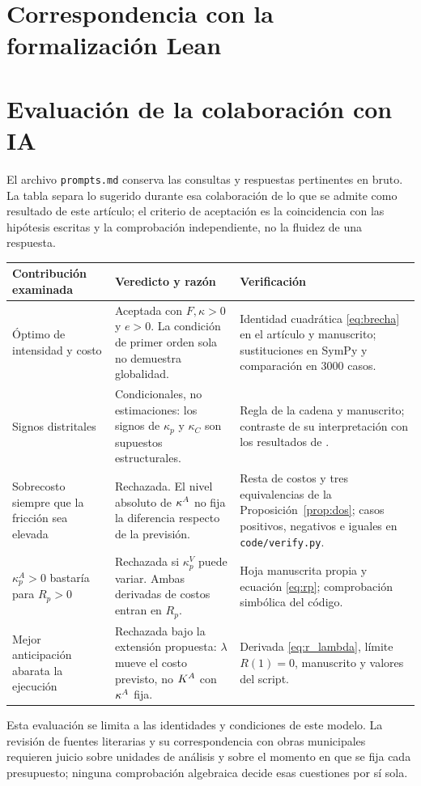 \clearpage
\section{Correspondencia con la formalización Lean}\label{app:lean}


\clearpage
\section{Evaluación de la colaboración con IA}\label{app:ia}
El archivo \texttt{prompts.md} conserva las consultas y respuestas pertinentes en bruto. La tabla separa lo sugerido durante esa colaboración de lo que se admite como resultado de este artículo; el criterio de aceptación es la coincidencia con las hipótesis escritas y la comprobación independiente, no la fluidez de una respuesta.
\begin{center}
\small
\begin{tabular}{p{.21\linewidth}p{.31\linewidth}p{.37\linewidth}}
\toprule
Contribución examinada & Veredicto y razón & Verificación \\
\midrule
Óptimo de intensidad y costo & Aceptada con $F,\kappa>0$ y $e>0$. La condición de primer orden sola no demuestra globalidad. & Identidad cuadrática \eqref{eq:brecha} en el artículo y manuscrito; sustituciones en SymPy y comparación en 3000 casos. \\
Signos distritales & Condicionales, no estimaciones: los signos de $\kappa_p$ y $\kappa_C$ son supuestos estructurales. & Regla de la cadena y manuscrito; contraste de su interpretación con los resultados de \citet{loayza2014}. \\
Sobrecosto siempre que la fricción sea elevada & Rechazada. El nivel absoluto de $\kappa^{A}$ no fija la diferencia respecto de la previsión. & Resta de costos y tres equivalencias de la Proposición~\ref{prop:dos}; casos positivos, negativos e iguales en \texttt{code/verify.py}. \\
$\kappa_p^A>0$ bastaría para $R_p>0$ & Rechazada si $\kappa_p^V$ puede variar. Ambas derivadas de costos entran en $R_p$. & Hoja manuscrita propia y ecuación \eqref{eq:rp}; comprobación simbólica del código. \\
Mejor anticipación abarata la ejecución & Rechazada bajo la extensión propuesta: $\lambda$ mueve el costo previsto, no $K^{A}$ con $\kappa^{A}$ fija. & Derivada \eqref{eq:r_lambda}, límite $R(1)=0$, manuscrito y valores del script. \\
\bottomrule
\end{tabular}
\end{center}
Esta evaluación se limita a las identidades y condiciones de este modelo. La revisión de fuentes literarias y su correspondencia con obras municipales requieren juicio sobre unidades de análisis y sobre el momento en que se fija cada presupuesto; ninguna comprobación algebraica decide esas cuestiones por sí sola.
